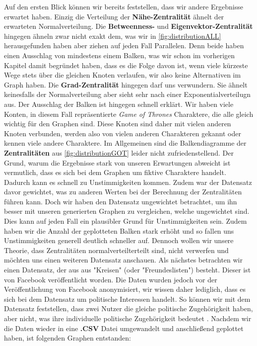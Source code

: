  Auf den ersten Blick können wir bereits feststellen, dass wir andere Ergebnisse erwartet haben. Einzig die Verteilung der \textbf{Nähe-Zentralität} ähnelt der erwarteten Normalverteilung. Die \textbf{Betweenness-} und \textbf{Eigenvektor-Zentralität} hingegen ähneln zwar nicht exakt dem, was wir in \ref{fig:distributionALL} herausgefunden haben aber ziehen auf jeden Fall Parallelen. Denn beide haben einen Ausschlag von mindestens einem Balken, was wir schon im vorherigen Kapitel damit begründet haben, dass es die Folge davon ist, wenn viele kürzeste Wege stets über die gleichen
Knoten verlaufen, wir also keine Alternativen im Graph haben. Die \textbf{Grad-Zentralität} hingegen darf uns verwundern. Sie ähnelt keinesfalls der Normalverteilung aber sieht sehr nach einer Exponentialverteilugn aus. Der Ausschlag der Balken ist hingegen schnell erklärt. Wir haben viele Konten, in diesem Fall repräsentierte \textit{Game of Thrones} Charaktere, die alle gleich wichtig für den Graphen sind. Diese Knoten sind daher mit vielen anderen Knoten verbunden, werden also von vielen anderen Charakteren gekannt oder kennen viele andere Charaktere. Im Allgemeinen sind die Balkendiagramme der \textbf{Zentralitäten} aus \ref{fig:distributionGOT} leider nicht zufriedenstellend. Der Grund, warum die Ergebnisse stark von unseren Erwartungen abweicht ist vermutlich, dass es sich bei dem Graphen um fiktive Charaktere handelt. Dadurch kann es schnell zu Unstimmigkeiten kommen. Zudem war der Datensatz davor gewichtet, was zu anderen Werten bei der Berechnung der Zentralitäten führen kann. Doch wir haben den Datensatz ungewichtet betrachtet, um ihn besser mit unseren generierten Graphen zu vergleichen, welche ungewichtet sind. Dies kann auf jeden Fall ein plausibler Grund für Unstimmigkeiten sein. Zudem haben wir die Anzahl der geplotteten Balken stark erhöht und so fallen uns Unstimmigkeiten generell deutlich schneller auf. Dennoch wollen wir unsere Theorie, dass Zentralitäten normalverteilterteilt sind, nicht verwerfen und möchten uns einen weiteren Datensatz anschauen. Als nächstes betrachten wir einen Datensatz, der aus aus "Kreisen" (oder "Freundeslisten") besteht. Dieser ist von Facebook veröffentlicht worden. Die Daten wurden jedoch vor der Veröffentlichung von Facebook anonymisiert, wir wissen daher lediglich, dass es sich bei dem Datensatz um politische Interessen handelt. So können wir mit dem Datensatz feststellen, dass zwei Nutzer die gleiche politische Zugehörigkeit haben, aber nicht, was ihre individuelle politische Zugehörigkeit bedeutet \cite{FBData}.
Nachdem wir die Daten wieder in eine \textbf{.CSV} Datei umgewandelt und anschließend geplottet haben, ist folgenden Graphen entstanden: 


